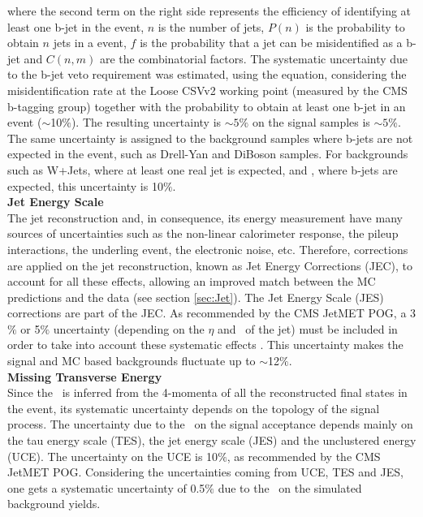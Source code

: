 \noindent where the second term on the right side represents 
the efficiency of identifying at least one b-jet in the event, $n$ is the number 
of jets, $P(n)$ is the probability to obtain $n$ jets in a event, $f$ is the 
probability that a jet can be misidentified as a b-jet and $C(n,m)$ are
the combinatorial factors. The systematic uncertainty due to the b-jet veto 
requirement was estimated, using the equation, considering the misidentification rate at the 
Loose CSVv2 working point (measured by the CMS b-tagging group) together with
the probability to obtain at least one b-jet in an event ($\sim$10$\%$). The resulting 
uncertainty is $\sim5\%$ on the signal samples is $\sim5\%$. The same uncertainty is 
assigned to the background samples where b-jets are not expected in the event, such as Drell-Yan 
and DiBoson samples. For backgrounds such as W+Jets, where at least one 
real jet is expected, and \ttbar, where b-jets are expected, this uncertainty is 10$\%$. \\
% 

\textbf{Jet Energy Scale}\\

\noindent The jet reconstruction and, in consequence, its energy measurement have many 
sources of uncertainties such as the non-linear calorimeter response, the pileup 
interactions, the underling event, the electronic noise, etc. Therefore,
corrections are applied on the jet reconstruction, known as Jet Energy 
Corrections (JEC), to account for all these effects, allowing
an improved match between the MC predictions and the data (see section \ref{sec:Jet}). The 
Jet  Energy Scale (JES) corrections are part of the JEC. As recommended by 
the CMS JetMET POG, a 3$\%$ or 5$\%$ uncertainty (depending on 
the $\eta$ and \pt~of the jet) must be included in order to take into account
these systematic effects \cite{JetMETPOG}. This uncertainty makes the 
signal and MC based backgrounds fluctuate up to $\sim$12$\%$. \\

\textbf{Missing Transverse Energy}\\

\noindent Since the \MET~is inferred from the 4-momenta of all the 
reconstructed final states in the event, its systematic 
uncertainty depends on the topology of the signal process.
The uncertainty due to the \MET~on the signal 
acceptance depends mainly on the tau energy scale (TES),
the jet energy scale (JES) and the unclustered energy (UCE). The 
uncertainty on the UCE is 10$\%$, as recommended by the 
CMS JetMET POG. Considering the uncertainties coming from UCE, TES and JES, one 
gets a systematic uncertainty of 0.5$\%$ due to the \MET~on the 
simulated background yields.\\

